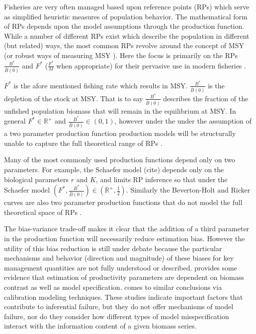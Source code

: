 \documentclass[12pt]{article}
\begin{document}
%
Fisheries are very often managed based upon reference points (RPs) which serve as
simplified heuristic measures of population behavior. The mathematical form of
RPs depends upon the model assumptions through the production function. %
While a number of different RPs exist which describe the population in different
(but related) ways, the most common RPs revolve around the concept of MSY (or robust
ways of measuring MSY ).
Here the focus is primarily on the RPs $\frac{B^*}{\bar B(0)}$ and $F^*$ ($\frac{F^*}{M}$ when appropriate)
for their pervasive use in modern fisheries .

%
$F^*$ is the afore mentioned fishing rate which results in MSY. $\frac{B^*}{\bar B(0)}$
is the depletion of the stock at MSY. That is to say $\frac{B^*}{\bar B(0)}$ describes
the fraction of the unfished population biomass that will remain in the equilibrium
at MSY. In general $F^*\in\mathbb{R}^+$ and \mbox{$\frac{B^*}{\bar B(0)}\in\left(0, 1\right)$,}
however under the under the assumption of a two parameter production function production 
models will be structurally unable to capture the full theoretical range of RPs 
.

%
Many of the most commonly used production functions depend only
on two parameters. For example, the Schaefer model {(\color{red}cite)}
depends only on the biological parameters $r$ and $K$, and limits RP inference 
so that under the Schaefer model $\left(F^*, \frac{B^*}{\bar B(0)}\right)\in \left(\mathbb{R}^+, \frac{1}{2}\right)$. 
Similarly the Beverton-Holt 
and Ricker  curves are also two parameter
production functions that do not model the full theoretical space of
RPs .

%
The bias-variance trade-off  makes it
clear that the addition of a third parameter in the production function will
necessarily reduce estimation bias. However the utility of this bias reduction
is still under debate because the particular mechanisms and behavior (direction and magnitude) %
of these biases for key management quantities %
are not fully understood or described.  provides some
evidence that estimation of productivity parameters %
are dependent on biomass contrast as well as model specification. %
 comes to similar conclusions %
via calibration modeling techniques. These studies indicate important factors that
contribute to inferential failure, but they do not offer mechanisms of model 
failure, nor do they consider how different types of model misspecification 
interact with the information content of a given biomass series.  
\end{document}
